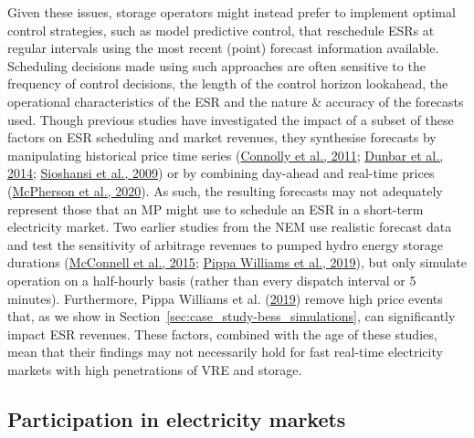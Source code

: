 \documentclass[12pt,a4paper,]{report}
\begin{document}
Given these issues, storage operators might instead prefer to implement
optimal control strategies, such as model predictive control, that
reschedule ESRs at regular intervals using the most recent (point)
forecast information available. Scheduling decisions made using such
approaches are often sensitive to the frequency of control decisions,
the length of the control horizon lookahead, the operational
characteristics of the ESR and the nature \& accuracy of the forecasts
used. Though previous studies have investigated the impact of a subset
of these factors on ESR scheduling and market revenues, they synthesise
forecasts by manipulating historical price time series
(\protect\hyperlink{ref-connollyPracticalOperationStrategies2011}{Connolly
et al., 2011};
\protect\hyperlink{ref-dunbarImpactElectricityPrice2014}{Dunbar et al.,
2014};
\protect\hyperlink{ref-sioshansiEstimatingValueElectricity2009}{Sioshansi
et al., 2009}) or by combining day-ahead and real-time prices
(\protect\hyperlink{ref-mcphersonImpactsStorageDispatch2020}{McPherson
et al., 2020}). As such, the resulting forecasts may not adequately
represent those that an MP might use to schedule an ESR in a short-term
electricity market. Two earlier studies from the NEM use realistic
forecast data and test the sensitivity of arbitrage revenues to pumped
hydro energy storage durations
(\protect\hyperlink{ref-mcconnellEstimatingValueElectricity2015}{McConnell
et al., 2015};
\protect\hyperlink{ref-pippawilliamsBatteryNationOperation2019}{Pippa
Williams et al., 2019}), but only simulate operation on a half-hourly
basis (rather than every dispatch interval or 5 minutes). Furthermore,
Pippa Williams et al.
(\protect\hyperlink{ref-pippawilliamsBatteryNationOperation2019}{2019})
remove high price events that, as we show in
Section~\ref{sec:case_study-bess_simulations}, can significantly impact
ESR revenues. These factors, combined with the age of these studies,
mean that their findings may not necessarily hold for fast real-time
electricity markets with high penetrations of VRE and storage.

\hypertarget{sec:info-context-esr-market_participation}{%
\subsection{Participation in electricity
markets}\label{sec:info-context-esr-market_participation}}
\end{document}
